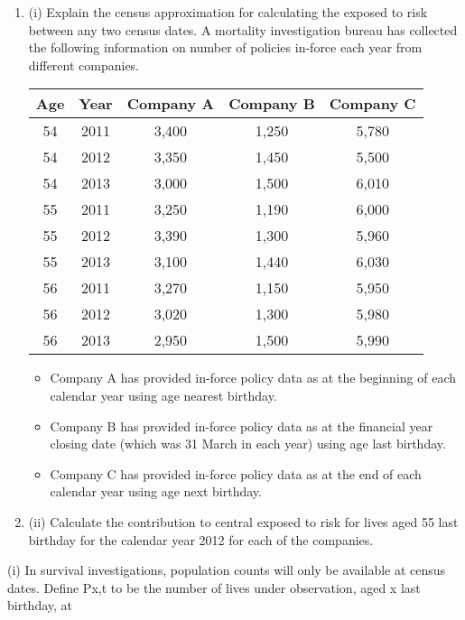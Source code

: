 \documentclass[a4paper,12pt]{article}
\begin{document}
\begin{enumerate}

\item (i) Explain the census approximation for calculating the exposed to risk between
any two census dates. 
A mortality investigation bureau has collected the following information on number
of policies in-force each year from different companies.
\begin{center}
\begin{tabular}{|c|c|c|c|c|}
Age	&	Year	&	Company A	&	Company B	&	Company C	\\ \hline
54	&	2011	&	3,400	&	1,250	&	5,780	\\ \hline
54	&	2012	&	3,350	&	1,450	&	5,500	\\ \hline
54	&	2013	&	3,000	&	1,500	&	6,010	\\ \hline
55	&	2011	&	3,250	&	1,190	&	6,000	\\ \hline
55	&	2012	&	3,390	&	1,300	&	5,960	\\ \hline
55	&	2013	&	3,100	&	1,440	&	6,030	\\ \hline
56	&	2011	&	3,270	&	1,150	&	5,950	\\ \hline
56	&	2012	&	3,020	&	1,300	&	5,980	\\ \hline
56	&	2013	&	2,950	&	1,500	&	5,990	\\ \hline
\end{tabular}
\end{center}

\begin{itemize}
\item Company A has provided in-force policy data as at the beginning of each calendar
year using age nearest birthday.
\item Company B has provided in-force policy data as at the financial year closing date
(which was 31 March in each year) using age last birthday.
\item Company C has provided in-force policy data as at the end of each calendar year
using age next birthday.
\end{itemize}
\item (ii) Calculate the contribution to central exposed to risk for lives aged 55 last
birthday for the calendar year 2012 for each of the companies. 
\end{enumerate}
 (i) In survival investigations, population counts will only be available at census
dates.
Define Px,t to be the number of lives under observation, aged x last birthday, at
\end{document}

